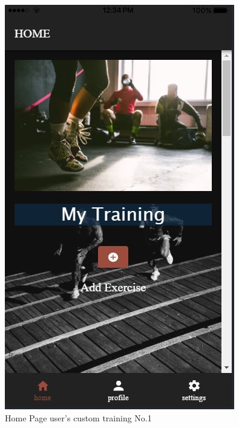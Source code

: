 \documentclass[a4paper,12pt]{article}
\begin{document}
			\begin{figure}[!htb]
				\caption{Home Page user's custom training No.1}
				\vspace*{0.5cm}

				  \includegraphics[width=\linewidth]{plan1}
				  

\end{figure}
\end{document}

